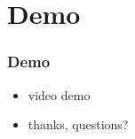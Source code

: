 \section{Demo}

\begin{frame}\frametitle{Demo}
\begin{itemize}
    \item <1-> video demo
    \item <2-> thanks, questions?
\end{itemize}
\end{frame}
